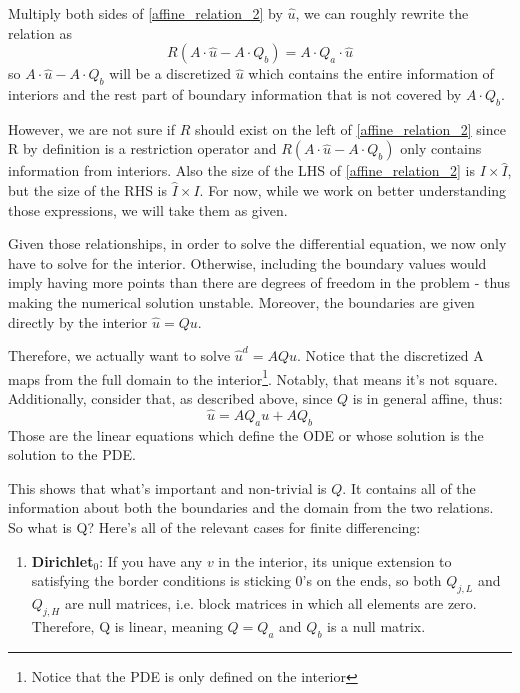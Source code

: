 \documentclass[11pt]{article}
\begin{document}
\begin{itemize}
		Multiply both sides of \eqref{affine_relation_2} by $\hat{u}$, we can roughly rewrite the relation as
		\begin{equation}
		R(A\cdot \hat{u}-A\cdot Q_b) = A\cdot Q_a\cdot \hat{u}
		\end{equation}
		so $A\cdot \hat{u}-A\cdot Q_b$ will be a discretized $\hat{u}$ which contains the entire information of interiors and the rest part of boundary information that is not covered by $A\cdot Q_b$. 
		
		However, we are not sure if $R$ should exist on the left of \eqref{affine_relation_2} since R by definition is a restriction operator and $R(A\cdot \hat{u}-A\cdot Q_b)$ only contains information from interiors. Also the size of the LHS of \eqref{affine_relation_2} is $I\times \hat{I}$, but the size of the RHS is $\hat{I}\times I$.
		For now, while we work on better understanding those expressions, we will take them as given.
		
		
		Given those relationships, in order to solve the differential equation, we now only have to solve for the interior. Otherwise, including the boundary values would imply having more points than there are degrees of freedom in the problem - thus making the numerical solution unstable. Moreover, the boundaries are given directly by the interior $\hat{u} = Qu$. 
		
		Therefore, we actually want to solve $\hat{u}^d = AQu$. Notice that the discretized A maps from the full domain to the interior\footnote{Notice that the PDE is only defined on the interior}. Notably, that means it's not square. Additionally, consider that, as described above, since $Q$ is in general affine, thus:
		\begin{equation}
		\hat{u} = AQ_au + AQ_b
		\end{equation}
	Those are the linear equations which define the ODE or whose solution is the solution to the PDE.
		
	This shows that what's important and non-trivial is $Q$. It contains all of the information about both the boundaries and the domain from the two relations. So what is Q? Here's all of the relevant cases for finite differencing:
	\begin{enumerate}
	\item \textbf{Dirichlet$_0$}: If you have any $v$ in the interior, its unique extension to satisfying the border conditions is sticking $0$'s on the ends, so both $Q_{j,L}$ and $Q_{j,H}$ are null matrices, i.e. block matrices in which all elements are zero. Therefore, Q is linear, meaning $Q = Q_a$ and $Q_b$ is a null matrix.
			

\end{enumerate}
\end{itemize}
\end{document}
